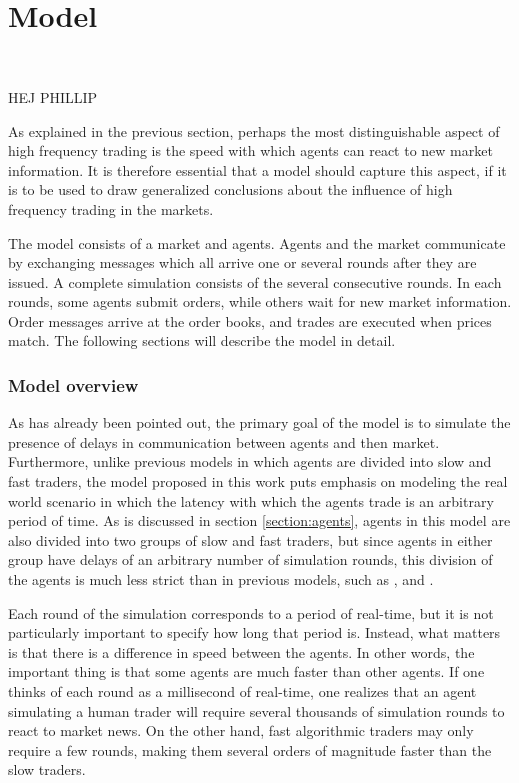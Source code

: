 \newpage
\part{Model} %

\label{chapter:model} %
$\frac{}{}$
	
HEJ PHILLIP

As explained in the previous section, perhaps the most distinguishable aspect of high frequency trading is the speed with which agents can react to new market information. It is therefore essential that a model should capture this aspect, if it is to be used to draw generalized conclusions about the influence of high frequency trading in the markets.

The model consists of a market and agents. Agents and the market communicate by exchanging messages which all arrive one or several rounds after they are issued. A complete simulation consists of the several consecutive rounds. In each rounds, some agents submit orders, while others wait for new market information. Order messages arrive at the order books, and trades are executed when prices match.  The following sections will describe the model in detail.



\section{Model overview}

As has already been pointed out, the primary goal of the model is to simulate the presence of delays in communication between agents and then market. Furthermore, unlike previous models in which agents are divided into slow and fast traders, the model proposed in this work puts emphasis on modeling the real world scenario in which the latency with which the agents trade is an arbitrary period of time. As is discussed in section \ref{section:agents}, agents in this model are also divided into two groups of slow and fast traders, but since agents in either group have delays of an arbitrary number of simulation rounds, this division of the agents is much less strict than in previous models, such as \cite{keylist}, \cite{} and \cite{}.

Each round of the simulation corresponds to a period of real-time, but it is not particularly important to specify how long that period is. Instead, what matters is that there is a difference in speed between the agents. In other words, the important thing is that some agents are much faster than other agents. If one thinks of each round as a millisecond of real-time, one realizes that an agent simulating a human trader will require several thousands of simulation rounds to react to market news. On the other hand, fast algorithmic traders may only require a few rounds, making them several orders of magnitude faster than the slow traders. 

